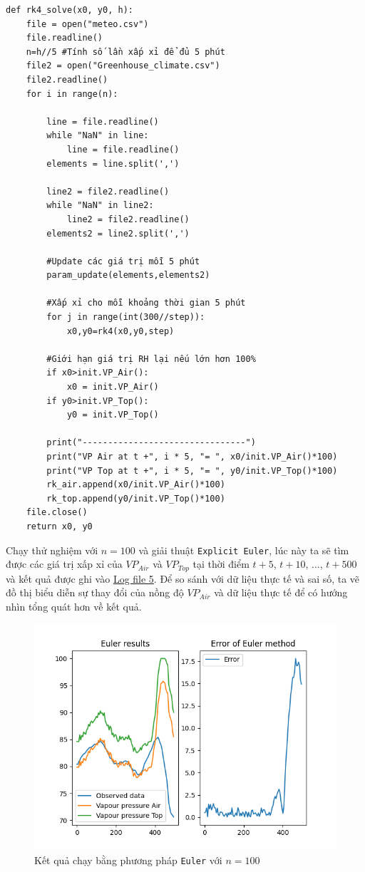 \documentclass[a4paper]{article}
\begin{document}
\begin{verbatim}
def rk4_solve(x0, y0, h):
    file = open("meteo.csv")
    file.readline()
    n=h//5 #Tính số lần xấp xỉ để đủ 5 phút
    file2 = open("Greenhouse_climate.csv")
    file2.readline()
    for i in range(n):

        line = file.readline()
        while "NaN" in line:
            line = file.readline()
        elements = line.split(',')

        line2 = file2.readline()
        while "NaN" in line2:
            line2 = file2.readline()
        elements2 = line2.split(',')
        
        #Update các giá trị mỗi 5 phút
        param_update(elements,elements2)
        
        #Xấp xỉ cho mỗi khoảng thời gian 5 phút
        for j in range(int(300//step)):
            x0,y0=rk4(x0,y0,step)
        
        #Giới hạn giá trị RH lại nếu lớn hơn 100%
        if x0>init.VP_Air():
            x0 = init.VP_Air()
        if y0>init.VP_Top():
            y0 = init.VP_Top()

        print("--------------------------------")
        print("VP Air at t +", i * 5, "= ", x0/init.VP_Air()*100)
        print("VP Top at t +", i * 5, "= ", y0/init.VP_Top()*100)
        rk_air.append(x0/init.VP_Air()*100)
        rk_top.append(y0/init.VP_Top()*100)
    file.close()
    return x0, y0
\end{verbatim}

Chạy thử nghiệm với $n=100$ và giải thuật \texttt{Explicit Euler}, lúc này ta sẽ tìm được các giá trị xấp xỉ của $VP_{Air}$ và $VP_{Top}$ tại thời điểm $t+5$, $t+10$, $...$, $t+500$ và kết quả được ghi vào \href{https://files.catbox.moe/tm4n6g.txt}{Log file 5}. Để so sánh với dữ liệu thực tế và sai số, ta vẽ đồ thị biểu diễn sự thay đổi của nồng độ $VP_{Air}$ và dữ liệu thực tế để có hướng nhìn tổng quát hơn về kết quả. 

\begin{figure}[!h]
    \centering
    \includegraphics[width=1.0\textwidth]{eul_100.png}
    \caption{Kết quả chạy bằng phương pháp \texttt{Euler} với $n=100$}
    \label{fig:eul_100}
\end{figure}
\end{document}
